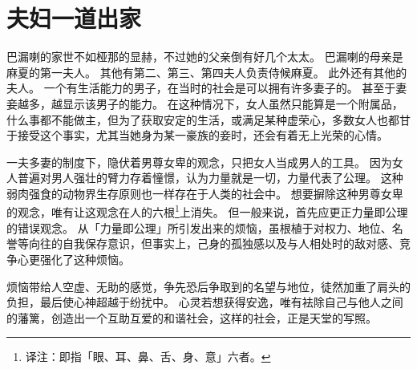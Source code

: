 \documentclass[twoside,openany]{book}
\begin{document}
\section{夫妇一道出家}\label{sec4.4}

巴漏喇的家世不如桠那的显赫，不过她的父亲倒有好几个太太。
巴漏喇的母亲是麻夏的第一夫人。
其他有第二、第三、第四夫人负责侍候麻夏。
此外还有其他的夫人。
一个有生活能力的男子，在当时的社会是可以拥有许多妻子的。
甚至于妻妾越多，越显示该男子的能力。
在这种情况下，女人虽然只能算是一个附属品，什么事都不能做主，但为了获取安定的生活，或满足某种虚荣心，多数女人也都甘于接受这个事实，尤其当她身为某一豪族的妾时，还会有着无上光荣的心情。

一夫多妻的制度下，隐伏着男尊女卑的观念，只把女人当成男人的工具。
因为女人普遍对男人强壮的臂力存着憧憬，认为力量就是一切，力量代表了公理。
这种弱肉强食的动物界生存原则也一样存在于人类的社会中。
%
%
%
%
%
想要摒除这种男尊女卑的观念，唯有让这观念在人的六根\footnote{译注：即指「眼、耳、鼻、舌、身、意」六者。}上消失。
但一般来说，首先应更正力量即公理的错误观念。
从「力量即公理」所引发出来的烦恼，虽根植于对权力、地位、名誉等向往的自我保存意识，但事实上，己身的孤独感以及与人相处时的敌对感、竞争心更强化了这种烦恼。

烦恼带给人空虚、无助的感觉，争先恐后争取到的名望与地位，徒然加重了肩头的负担，最后使心神超越于纷扰中。
心灵若想获得安逸，唯有袪除自己与他人之间的藩篱，创造出一个互助互爱的和谐社会，这样的社会，正是天堂的写照。
%
%
%
%
%
%
%
%
%
%
%
\end{document}
